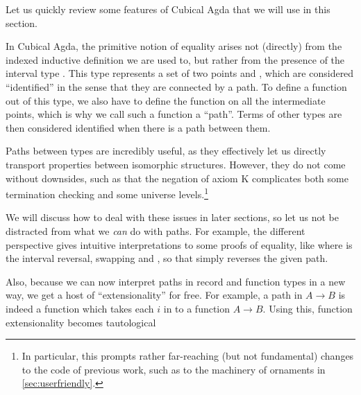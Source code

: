 Let us quickly review some features of Cubical Agda \cite{cuagda} that we will use in this section.

In Cubical Agda, the primitive notion of equality arises not (directly) from the indexed inductive definition we are used to, but rather from the presence of the interval type . This type represents a set of two points  and , which are considered ``identified'' in the sense that they are connected by a path. To define a function out of this type, we also have to define the function on all the intermediate points, which is why we call such a function a ``path''. Terms of other types are then considered identified when there is a path between them.

Paths between types are incredibly useful, as they effectively let us directly transport properties between isomorphic structures. However, they do not come without downsides, such as that the negation of axiom K complicates both some termination checking and some universe levels.\footnote{In particular, this prompts rather far-reaching (but not fundamental) changes to the code of previous work, such as to the machinery of ornaments \cite{progorn} in \autoref{sec:userfriendly}.} %

We will discuss how to deal with these issues in later sections, so let us not be distracted from what we \emph{can} do with paths. For example, the different perspective gives intuitive interpretations to some proofs of equality, like
where  is the interval reversal, swapping  and , so that  simply reverses the given path.

Also, because we can now interpret paths in record and function types in a new way, we get a host of ``extensionality'' for free. For example, a path in $A \to B$ is indeed a function which takes each $i$ in  to a function $A \to B$. Using this, function extensionality becomes tautological 

